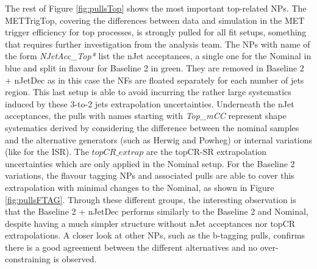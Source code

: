 The rest of Figure \ref{fig:pullsTop} shows the most important top-related NPs. The METTrigTop, covering the differences between data and simulation in the MET trigger efficiency for top processes, is strongly pulled for all fit setups, something that requires further investigation from the analysis team. The NPs with name of the form \textit{NJetAcc\_Top*} list the nJet acceptances, a single one for the Nominal in blue and split in flavour for Baseline 2 in green. They are removed in Baseline 2 + nJetDec as in this case the NFs are floated separately for each number of jets region. This last setup is able to avoid incurring the rather large systematics induced by these 3-to-2 jets extrapolation uncertainties. Underneath the nJet acceptances, the pulls with names starting with \textit{Top\_mCC} represent shape systematics derived by considering the difference between the nominal samples and the alternative generators (such as Herwig and Powheg) or internal variations (like for the ISR). The $topCR\_extrap$ are the topCR-SR extrapolation uncertainties which are only applied in the Nominal setup. For the Baseline 2 variations, the flavour tagging NPs and associated pulls are able to cover this extrapolation with minimal changes to the Nominal, as shown in Figure \ref{fig:pullsFTAG}. Through these different groups, the interesting observation is that the Baseline 2 + nJetDec performs similarly to the Baseline 2 and Nominal, despite having a much simpler structure without nJet acceptances nor topCR extrapolations. A closer look at other NPs, such as the b-tagging pulls, confirms there is a good agreement between the different alternatives and no over-constraining is observed. \\

